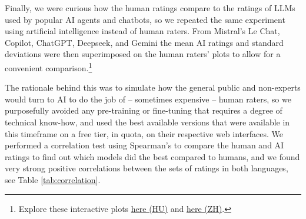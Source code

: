 \documentclass[10pt, a4paper]{article}
\begin{document}
Finally, we were curious how the human ratings compare to the ratings of LLMs used by popular AI agents and chatbots, so we repeated the same experiment using artificial intelligence instead of human raters. From Mistral's Le Chat, Copilot, ChatGPT, Deepseek, and Gemini the mean AI ratings and standard deviations were then superimposed on the human raters' plots to allow for a convenient comparison.\footnote{Explore these interactive plots \href{https://anonymous.4open.science/api/repo/occupational-gender-bias/file/occupations_hu_with_ai.html?v=f85e72d8}{here (HU)} and \href{https://anonymous.4open.science/api/repo/occupational-gender-bias/file/occupations_zh_with_ai.html?v=0d6757c5}{here (ZH)}.}


The rationale behind this was to simulate how the general public and non-experts would turn to AI to do the job of -- sometimes expensive -- human raters, so we purposefully avoided any pre-training or fine-tuning that requires a degree of technical know-how, and used the best available versions that were available in this timeframe on a free tier, in quota, on their respective web interfaces. We performed a correlation test using Spearman's \textit{\rho} to compare the human and AI ratings to find out which models did the best compared to humans, and we found very strong positive correlations between the sets of ratings in both languages, see Table \ref{tab:correlation}.



\end{document}
